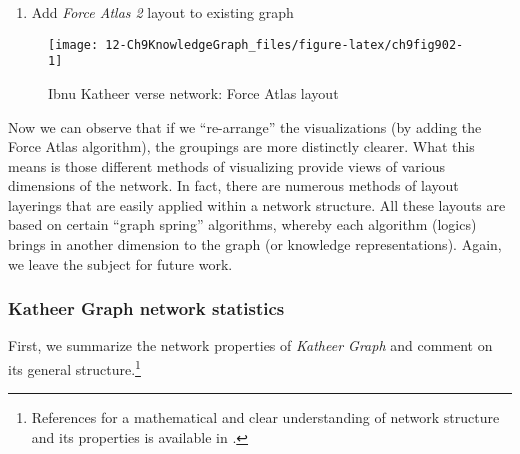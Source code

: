 \documentclass[
]{article}
\providecommand{\tightlist}{%
  \setlength{\itemsep}{0pt}\setlength{\parskip}{0pt}}
\begin{document}
\begin{enumerate}
\def\labelenumi{\arabic{enumi}.}
\setcounter{enumi}{1}
\tightlist
\item
  Add \emph{Force Atlas 2} layout to existing graph
\end{enumerate}

\begin{figure}

{\centering \texttt{[image: 12-Ch9KnowledgeGraph\_files/figure-latex/ch9fig902-1]} 

}

\caption{Ibnu Katheer verse network: Force Atlas layout}\label{fig:ch9fig902}
\end{figure}

Now we can observe that if we ``re-arrange'' the visualizations (by adding the Force Atlas algorithm), the groupings are more distinctly clearer. What this means is those different methods of visualizing provide views of various dimensions of the network. In fact, there are numerous methods of layout layerings that are easily applied within a network structure. All these layouts are based on certain ``graph spring'' algorithms, whereby each algorithm (logics) brings in another dimension to the graph (or knowledge representations). Again, we leave the subject for future work.

\hypertarget{katheer-graph-network-statistics}{%
\subsubsection{Katheer Graph network statistics}\label{katheer-graph-network-statistics}}

First, we summarize the network properties of \emph{Katheer Graph} and comment on its general structure.\footnote{References for a mathematical and clear understanding of network structure and its properties is available in \citet{barabasi2016}.}

\footnotesize
\end{document}
